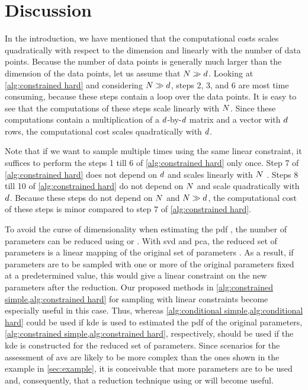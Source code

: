 \section{Discussion}
\label{sec:discussion}

In the introduction, we have mentioned that the computational costs scales quadratically with respect to the dimension and linearly with the number of data points.
Because the number of data points is generally much larger than the dimension of the data points, let us assume that $N \gg d$.
Looking at \cref{alg:constrained hard} and considering $N \gg d$, steps 2, 3, and 6 are most time consuming, because these steps contain a loop over the data points. 
It is easy to see that the computations of these steps scale linearly with $N$. 
Since these computations contain a multiplication of a $d$-by-$d$ matrix and a vector with $d$ rows, the computational cost scales quadratically with $d$. 

Note that if we want to sample multiple times using the same linear constraint, it suffices to perform the steps 1 till 6 of \cref{alg:constrained hard} only once.
Step 7 of \cref{alg:constrained hard} does not depend on $d$ and scales linearly with $N$ \autocite{vose1991linear}.
Steps 8 till 10 of \cref{alg:constrained hard} do not depend on $N$ and scale quadratically with $d$.
Because these steps do not depend on $N$ and $N \gg d$, the computational cost of these steps is minor compared to step 7 of \cref{alg:constrained hard}. 

To avoid the curse of dimensionality when estimating the \ac{pdf} \autocite{scott1992multivariate}, the number of parameters can be reduced using  or .
With \ac{svd} and \ac{pca}, the reduced set of parameters is a linear mapping of the original set of parameters \autocite{golub2013matrix, abdi2010principal}.
As a result, if parameters are to be sampled with one or more of the original parameters fixed at a predetermined value, this would give a linear constraint on the new parameters after the reduction.
Our proposed methods in \cref{alg:constrained simple,alg:constrained hard} for sampling with linear constraints become especially useful in this case.
Thus, whereas \cref{alg:conditional simple,alg:conditional hard} could be used if \ac{kde} is used to estimated the \ac{pdf} of the original parameters, \cref{alg:constrained simple,alg:constrained hard}, respectively, should be used if the \ac{kde} is constructed for the reduced set of parameters.
Since scenarios for the assessment of \acp{av} are likely to be more complex than the ones shown in the example in \cref{sec:example}, it is conceivable that more parameters are to be used and, consequently, that a reduction technique using  or  will become useful.
